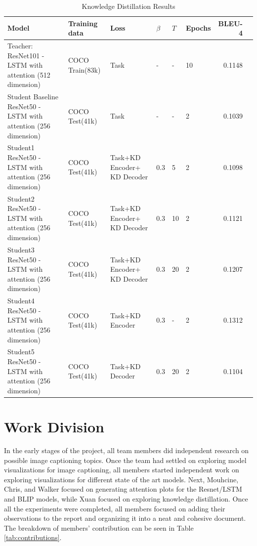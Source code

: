 \documentclass[10pt,twocolumn,letterpaper]{article}
\begin{document}
\begin{table}[]
    \centering
    \begin{tabular}{p{6cm}lllllrl}
        \toprule
        \textbf{Model} & \textbf{Training data} & \textbf{Loss} & \textbf{$\beta$} & \textbf{$T$} & \textbf{Epochs} & \textbf{BLEU-4} \\
        \midrule
        Teacher: ResNet101 - LSTM with attention (512 dimension) & COCO Train(83k) & Task & - & - & 10 & 0.1148   \\
        Student Baseline ResNet50 - LSTM with attention (256 dimension) & COCO Test(41k) & Task & - & - & 2 & 0.1039   \\
        Student1 ResNet50 - LSTM with attention (256 dimension) & COCO Test(41k) & Task+KD Encoder+ KD Decoder & 0.3 & 5 & 2 & 0.1098   \\
        Student2 ResNet50 - LSTM with attention (256 dimension) & COCO Test(41k) & Task+KD Encoder+ KD Decoder & 0.3  & 10 & 2 & 0.1121   \\
        Student3 ResNet50 - LSTM with attention (256 dimension) & COCO Test(41k) & Task+KD Encoder+ KD Decoder & 0.3  & 20 & 2 & 0.1207   \\
        Student4 ResNet50 - LSTM with attention (256 dimension) & COCO Test(41k) & Task+KD Encoder & 0.3  & - & 2 & 0.1312   \\
        Student5 ResNet50 - LSTM with attention (256 dimension) & COCO Test(41k) & Task+KD Decoder & 0.3  & 20 & 2 & 0.1104   \\

        \bottomrule
        \bottomrule
    \end{tabular}
    \caption{Knowledge Distillation Results}
    \label{tab:KDResult}
\end{table}


\section{Work Division}

In the early stages of the project, all team members did independent research on possible image captioning topics. Once the team had settled on exploring model visualizations for image captioning, all members started independent work on exploring visualizations for different state of the art models. Next, Mouhcine, Chris, and Walker focused on generating attention plots for the Resnet/LSTM and BLIP models, while Xuan focused on exploring knowledge distillation. Once all the experiments were completed, all members focused on adding their observations to the report and organizing it into a neat and cohesive document. The breakdown of members' contribution can be seen in Table \ref {tab:contributions}.
\end{document}

